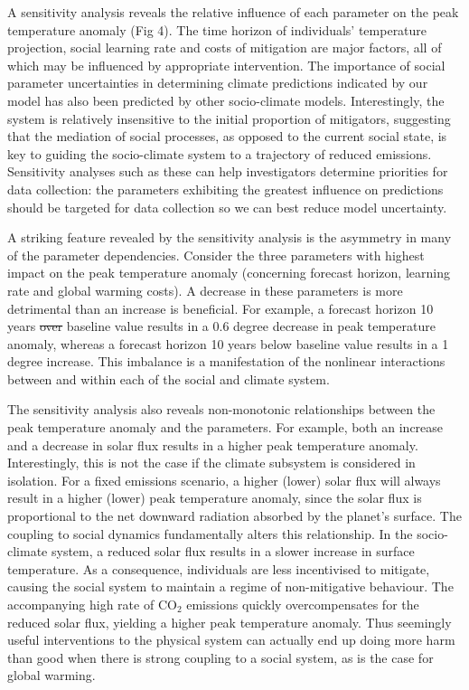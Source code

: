 \documentclass[10pt,letterpaper]{article}
\providecommand{\DIFaddtex}[1]{{\protect\color{blue}\uwave{#1}}} %
\providecommand{\DIFdeltex}[1]{{\protect\color{red}\sout{#1}}}                      %
\providecommand{\DIFaddbegin}{} %
\providecommand{\DIFaddend}{} %
\providecommand{\DIFdelbegin}{} %
\providecommand{\DIFdelend}{} %
\providecommand{\DIFadd}[1]{\texorpdfstring{\DIFaddtex{#1}}{#1}} %
\providecommand{\DIFdel}[1]{\texorpdfstring{\DIFdeltex{#1}}{}} %
\begin{document}
A sensitivity analysis reveals the relative influence of each parameter on the peak temperature anomaly (Fig 4). The time horizon of individuals' temperature projection, social learning rate and costs of mitigation are major factors, all of which may be influenced by appropriate intervention. The importance of social parameter uncertainties in determining climate predictions indicated by our model has also been predicted by other socio-climate models\cite{beckage18}. Interestingly, the system is relatively insensitive to the initial proportion of mitigators, suggesting that the mediation of social processes, as opposed to the current social state, is key to guiding the socio-climate system to a trajectory of reduced emissions. Sensitivity analyses such as these can help investigators determine priorities for data collection: the parameters exhibiting the greatest influence on predictions should be targeted for data collection so we can best reduce model uncertainty.

A striking feature revealed by the sensitivity analysis is the asymmetry in many of the parameter dependencies. Consider the three parameters with highest impact on the peak temperature anomaly (concerning forecast horizon, learning rate and global warming costs). A decrease in these parameters is more detrimental than an increase is beneficial. For example, a forecast horizon 10 years \DIFdelbegin \DIFdel{over }\DIFdelend \DIFaddbegin \DIFadd{above }\DIFaddend baseline value results in a 0.6 degree decrease in peak temperature anomaly, whereas a forecast horizon 10 years below baseline value results in a 1 degree increase. This imbalance is a manifestation of the nonlinear interactions between and within each of the social and climate system.

The sensitivity analysis also reveals non-monotonic relationships between the peak temperature anomaly and the parameters. For example, both an increase and a decrease in solar flux results in a higher peak temperature anomaly. Interestingly, this is not the case if the climate subsystem is considered in isolation. For a fixed emissions scenario, a higher (lower) solar flux will always result in a higher (lower) peak temperature anomaly, since the solar flux is proportional to the net downward radiation absorbed by the planet's surface. The coupling to social dynamics fundamentally alters this relationship. In the socio-climate system, a reduced solar flux results in a slower increase in surface temperature. As a consequence, individuals are less incentivised to mitigate, causing the social system to maintain a regime of non-mitigative behaviour. The accompanying high rate of $\text{CO}_2$ emissions quickly overcompensates for the reduced solar flux, yielding a higher peak temperature anomaly. Thus seemingly useful interventions to the physical system can actually end up doing more harm than good when there is strong coupling to a social system, as is the case for global warming.
\end{document}
